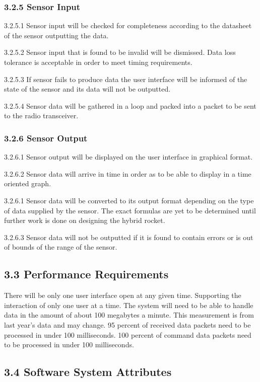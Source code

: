 \documentclass[10pt,draftclsnofoot,onecolumn]{IEEEtran}
\begin{document}
\subsubsection{3.2.5 Sensor Input}
	3.2.5.1 Sensor input will be checked for completeness according to the datasheet of the sensor outputting the data.\par
	3.2.5.2 Sensor input that is found to be invalid will be dismissed. Data loss tolerance is acceptable in order to meet timing requirements.\par
	3.2.5.3 If sensor fails to produce data the user interface will be informed of the state of the sensor and its data will not be outputted.\par
	3.2.5.4 Sensor data will be gathered in a loop and packed into a packet to be sent to the radio transceiver.\par
\subsubsection{3.2.6 Sensor Output}
	3.2.6.1 Sensor output will be displayed on the user interface in graphical format.\par
	3.2.6.2  Sensor data will arrive in time in order as to be able to display in a time oriented graph.\par
	3.2.6.1 Sensor data will be converted to its output format depending on the type of data supplied by the sensor. The exact formulas are yet to be 		determined until further work is done on designing the hybrid rocket.\par
	3.2.6.3 Sensor data will not be outputted if it is found to contain errors or is out of bounds of the range of the sensor.\par

\subsection{3.3 Performance Requirements}
There will be only one user interface open at any given time. Supporting the interaction of only one user at a time. The system will need to be able to handle data in the amount of about 100 megabytes a minute. This measurement is from last year’s data and may change. 95 percent of received data packets need to be processed in under 100 milliseconds. 100 percent of command data packets need to be processed in under 100 milliseconds.

\subsection{3.4 Software System Attributes}
\end{document}
